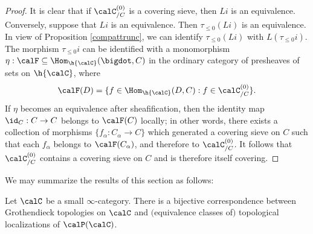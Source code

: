 \begin{proof}
It is clear that if $\calC^{(0)}_{/C}$ is a covering sieve, then $Li$ is an equivalence. Conversely, suppose that $Li$ is an equivalence. Then $\tau_{\leq 0}(L i)$ is an equivalence. In view of
Proposition \ref{compattrunc}, we can identify $\tau_{\leq 0}(Li)$ with $L (\tau_{\leq 0} i)$.
The morphism $\tau_{\leq 0} i$ can be identified with a monomorphism 
$\eta: \calF \subseteq \Hom_{\h{\calC}}( \bigdot, C)$ in the ordinary category of presheaves of sets on $\h{\calC}$, where $$\calF(D) = \{ f \in \Hom_{\h{\calC}}(D,C): f \in \calC^{(0)}_{/C} \}.$$ 
If $\eta$ becomes an equivalence after sheafification, then the identity map
$\id_{C}: C \rightarrow C$ belongs to $\calF(C)$ locally; in other words, 
there exists a collection of morphisms $\{ f_{\alpha}: C_{\alpha} \rightarrow C \}$ which
generated a covering sieve on $C$ such that each $f_{\alpha}$ belongs to
$\calF(C_{\alpha})$, and therefore to $\calC^{(0)}_{/C}$. It follows that
$\calC^{(0)}_{/C}$ contains a covering sieve on $C$ and is therefore itself covering.
\end{proof}

We may summarize the results of this section as follows:

\begin{proposition}\label{toprole}
Let $\calC$ be a small $\infty$-category. There is a bijective correspondence
between Grothendieck topologies on $\calC$ and $($equivalence classes of$)$ topological localizations of $\calP(\calC)$.
\end{proposition}

